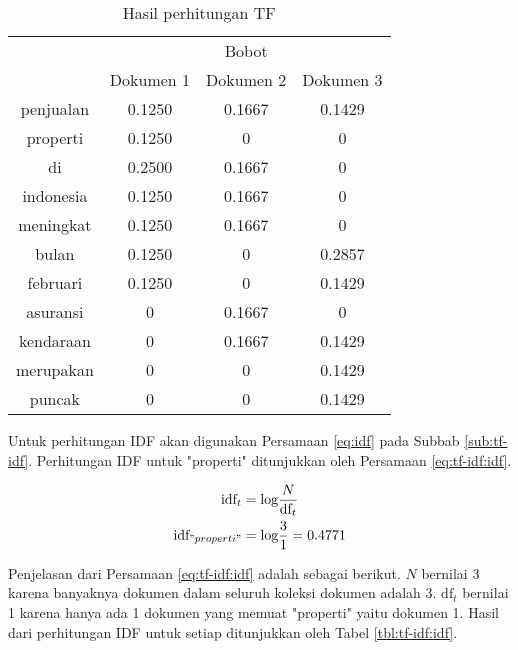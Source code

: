 \begin{table}[H]
	\centering
	\caption{Hasil perhitungan TF}
	\begin{tabular}{|c|c|c|c|} \hline
		\multirow{2}{*}{\Term} & \multicolumn{3}{c|}{Bobot} \\ \cline{2-4}
		& Dokumen 1 & Dokumen 2 & Dokumen 3 \\ \hline 
        penjualan & 0.1250 & 0.1667 & 0.1429  \\ \hline
        properti & 0.1250 & 0 & 0  \\ \hline
        di & 0.2500 & 0.1667 & 0  \\ \hline
        indonesia & 0.1250 & 0.1667 & 0  \\ \hline
        meningkat & 0.1250 & 0.1667 & 0  \\ \hline
        bulan & 0.1250 & 0 & 0.2857  \\ \hline
        februari & 0.1250 & 0 & 0.1429  \\ \hline
        asuransi & 0 & 0.1667 & 0  \\ \hline
        kendaraan & 0 & 0.1667 & 0.1429  \\ \hline
        merupakan & 0 & 0 & 0.1429  \\ \hline
        puncak & 0 &	0 &	0.1429  \\ \hline
	\end{tabular}
	\label{tbl:tf-idf:tf}
\end{table}

Untuk perhitungan IDF akan digunakan Persamaan \ref{eq:idf} pada Subbab \ref{sub:tf-idf}. Perhitungan IDF untuk \term "properti" ditunjukkan oleh Persamaan \ref{eq:tf-idf:idf}.

\begin{equation}
	\label{eq:tf-idf:idf}
	\begin{gathered}
	\textrm{idf}_t = \textrm{log} \frac{N}{\textrm{df}_t} \\
	\textrm{idf}_{"properti"}=\textrm{log} \frac{3}{1}=0.4771
	\end{gathered}
\end{equation}

Penjelasan dari Persamaan \ref{eq:tf-idf:idf} adalah sebagai berikut. $N$ bernilai 3 karena banyaknya dokumen dalam seluruh koleksi dokumen adalah 3. $\textrm{df}_t$ bernilai 1 karena hanya ada 1 dokumen yang memuat \term "properti" yaitu dokumen 1. Hasil dari perhitungan IDF untuk setiap \term ditunjukkan oleh Tabel \ref{tbl:tf-idf:idf}.

